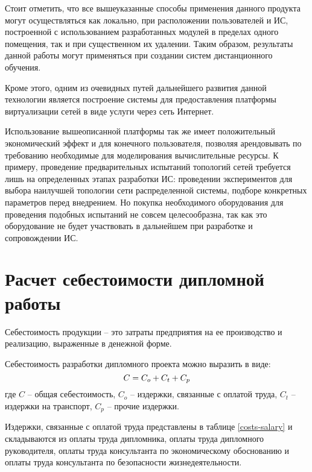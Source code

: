 Стоит отметить, что все вышеуказанные способы применения данного продукта могут 
осуществляться как локально, при расположении пользователей и ИС, построенной с 
использованием разработанных модулей в пределах одного помещения, так и при 
существенном их удалении. Таким образом, результаты данной работы могут применяться 
при создании систем дистанционного обучения.

Кроме этого, одним из очевидных путей дальнейшего развития данной технологии 
является построение системы для предоставления платформы виртуализации сетей 
в виде услуги через сеть Интернет.

Использование вышеописанной платформы так же имеет положительный экономический
эффект и для конечного пользователя, позволяя арендовывать по требованию необходимые
для моделирования вычислительные ресурсы. К примеру, проведение 
предварительных испытаний топологий сетей требуется лишь на определенных этапах
разработки ИС: проведении экспериментов для выбора наилучшей топологии 
сети распределенной системы, подборе конкретных параметров перед внедрением.
Но покупка необходимого оборудования для проведения подобных испытаний
не совсем целесообразна, так как это оборудование не будет участвовать в дальнейшем
при разработке и сопровождении ИС.

\section{Расчет себестоимости дипломной работы}

Себестоимость продукции -- это затраты предприятия на ее производство и реализацию, выраженные в денежной форме.

Себестоимость разработки дипломного проекта можно выразить в виде:
\begin{equation}
    C = C_{o} + C_{t} + C_{p} \\
\end{equation}
где $C$ -- общая себестоимость, $C_o$ -- издержки, связанные с оплатой труда, $C_t$ -- издержки на транспорт, $C_p$ -- прочие издержки.

Издержки, связанные с оплатой труда представлены в таблице \ref{costs-salary}
и складываются из оплаты труда дипломника, оплаты труда дипломного руководителя, оплаты труда консультанта по экономическому обоснованию и оплаты труда консультанта по безопасности жизнедеятельности.

